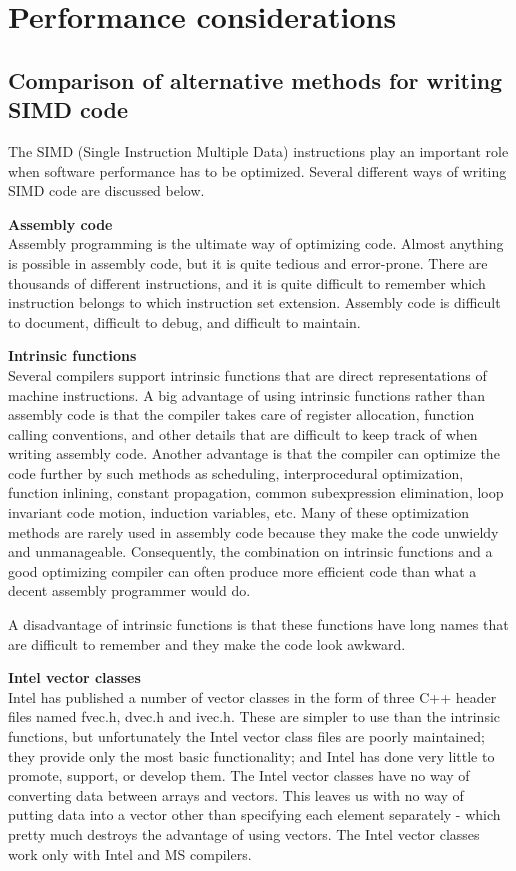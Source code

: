 \documentclass[vcl_manual.tex]{subfiles}
\begin{document}
\chapter{Performance considerations}\label{chap:PerformanceConsiderations}

\section{Comparison of alternative methods for writing SIMD code}\label{AlternativeMethodsForSIMDCode}
\flushleft

The SIMD (Single Instruction Multiple Data) instructions play an important role when software performance has to be optimized. Several different ways of writing SIMD code are discussed below.

\textbf{Assembly code}\\
Assembly programming is the ultimate way of optimizing code. Almost anything is possible in assembly code, but it is quite tedious and error-prone. There are thousands of different instructions, and it is quite difficult to remember which instruction belongs to which instruction set extension. Assembly code is difficult to document, difficult to debug, and difficult to maintain.

\textbf{Intrinsic functions}\\
Several compilers support intrinsic functions that are direct representations of machine instructions. A big advantage of using intrinsic functions rather than assembly code is that the compiler takes care of register allocation, function calling conventions, and other details that are difficult to keep track of when writing assembly code. Another advantage is that the compiler can optimize the code further by such methods as scheduling, interprocedural optimization, function inlining, constant propagation, common subexpression elimination, loop invariant code motion, induction variables, etc. Many of these optimization methods are rarely used in assembly code because they make the code unwieldy and unmanageable. Consequently, the combination on intrinsic functions and a good optimizing compiler can often produce more efficient code than what a decent assembly programmer would do.

A disadvantage of intrinsic functions is that these functions have long names that are difficult to remember and they make the code look awkward.

\textbf{Intel vector classes}\\
Intel has published a number of vector classes in the form of three C++ header files named fvec.h, dvec.h and ivec.h. These are simpler to use than the intrinsic functions, but unfortunately the Intel vector class files are poorly maintained; they provide only the most basic functionality; and Intel has done very little to promote, support, or develop them. The Intel vector classes have no way of converting data between arrays and vectors. This leaves us with no way of putting data into a vector other than specifying each element separately - which pretty much destroys the advantage of using vectors. The Intel vector classes work only with Intel and MS compilers.
\end{document}

